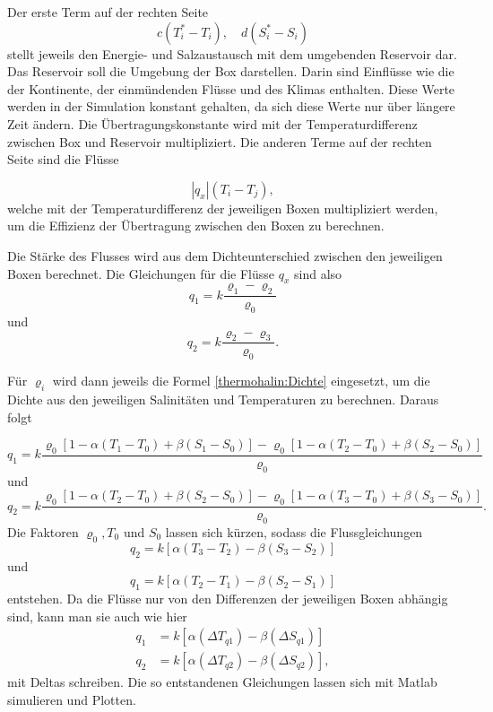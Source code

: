 Der erste Term auf der rechten Seite
\begin{equation*}
	c(T_i^*-T_i), \quad d(S_i^*-S_i)
\end{equation*}
stellt jeweils den Energie- und Salzaustausch mit dem umgebenden Reservoir dar. Das Reservoir soll die Umgebung der Box darstellen. Darin sind Einflüsse wie die der Kontinente, der einmündenden Flüsse und des Klimas enthalten. Diese Werte werden in der Simulation konstant gehalten, da sich diese Werte nur über längere Zeit ändern. Die Übertragungskonstante wird mit der Temperaturdifferenz zwischen Box und Reservoir multipliziert. Die anderen Terme auf der rechten Seite sind die Flüsse

\begin{equation*}
	|q_x|(T_i-T_j),
\end{equation*}
welche mit der Temperaturdifferenz der jeweiligen Boxen multipliziert werden, um die Effizienz der Übertragung zwischen den Boxen zu berechnen.  


Die Stärke des Flusses wird aus dem Dichteunterschied zwischen den jeweiligen Boxen berechnet. 
Die Gleichungen für die Flüsse $q_x$ sind also 
\begin{equation}
	q_1 = k\frac{\varrho_1-\varrho_2}{\varrho_0}
\end{equation}
und 
\begin{equation}
q_2 = k\frac{\varrho_2-\varrho_3}{\varrho_0}.
\end{equation}

Für $\varrho_i$ wird dann jeweils die Formel \eqref{thermohalin:Dichte} eingesetzt, um die Dichte aus den jeweiligen Salinitäten und Temperaturen zu berechnen. Daraus folgt

\begin{equation}
q_1 = k\frac{\varrho_0[1-\alpha(T_1-T_0)+\beta(S_1-S_0)]-\varrho_0[1-\alpha(T_2-T_0)+\beta(S_2-S_0)]}{\varrho_0}
\end{equation}
und 
\begin{equation}
q_2 = k\frac{\varrho_0[1-\alpha(T_2-T_0)+\beta(S_2-S_0)]-\varrho_0[1-\alpha(T_3-T_0)+\beta(S_3-S_0)]}{\varrho_0}.
\end{equation}
Die Faktoren $\varrho_0, T_0$ und $S_0$ lassen sich kürzen, sodass die Flussgleichungen 
\begin{equation}
 q_2 = k[\alpha(T_3-T_2)-\beta(S_3-S_2)]
\end{equation}
und 
\begin{equation}
 q_1 = k[\alpha(T_2-T_1)-\beta(S_2-S_1)] 
\end{equation}
entstehen.
Da die Flüsse nur von den Differenzen der jeweiligen Boxen abhängig sind, kann man sie auch wie hier
\begin{equation}
\begin{aligned}
q_1 &= k[\alpha(\Delta T_{q1})-\beta(\Delta S_{q1})] 
\\
q_2 &= k[\alpha(\Delta T_{q2})-\beta(\Delta S_{q2})],
\end{aligned}
\end{equation}
mit Deltas schreiben.
Die so entstandenen Gleichungen lassen sich mit Matlab simulieren und Plotten.


